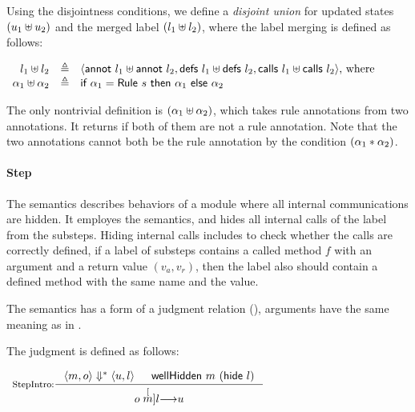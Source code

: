 Using the disjointness conditions, we define a \emph{disjoint union}
for updated states $(u_1 \uplus u_2)$ and the merged label
$(l_1 \uplus l_2)$, where the label merging is defined as follows:

\begin{definition}
  \label{def-lplus}
  \mbox{}
  \begin{center}
    \begin{math}
      \begin{array}{rcl}
        l_1 \uplus l_2 & \triangleq &
        \langle \textsf{annot}\ l_1 \uplus \textsf{annot}\ l_2, \textsf{defs}\ l_1 \uplus \textsf{defs}\ l_2, \textsf{calls}\ l_1 \uplus \textsf{calls}\ l_2 \rangle \textrm{, where} \\
        \alpha_1 \uplus \alpha_2 & \triangleq &
        \textsf{if}\ \alpha_1 = \textsf{Rule}\ s\ \textsf{then}\ \alpha_1\
        \textsf{else}\ \alpha_2 \\
      \end{array}
    \end{math}
  \end{center}
\end{definition}

The only nontrivial definition is $(\alpha_1 \uplus \alpha_2)$,
which takes rule annotations from two annotations. It returns
\alphameth{} if both of them are not a rule annotation. Note that the
two annotations cannot both be the rule annotation by the condition
$(\alpha_1 \ast \alpha_2)$.

\paragraph{Step}
The \Step{} semantics describes behaviors of a module where all
internal communications are hidden. It employes the \Substep{}
semantics, and hides all internal calls of the label from the
substeps. Hiding internal calls includes to check whether the calls
are correctly defined, \ie{} if a label of substeps contains a called
method $f$ with an argument and a return value $(v_a, v_r)$, then the
label also should contain a defined method with the same name and the
value.

The \Step{} semantics has a form of a judgment relation
(), arguments have the same meaning as in
\Substeps{}.

\begin{definition}
  \label{def-semstep}
  The judgment  is defined as follows:
  \begin{center}
    \begin{math}
      \begin{array}{c}
        \inference[StepIntro:]{\semsss{m}{o}{u}{l} & \wellhidden{m}{(\hide{l})}}
                  {\semstep{m}{o}{u}{l}} \\
        \mbox{} \\
      \end{array}
    \end{math}
  \end{center}
\end{definition}

